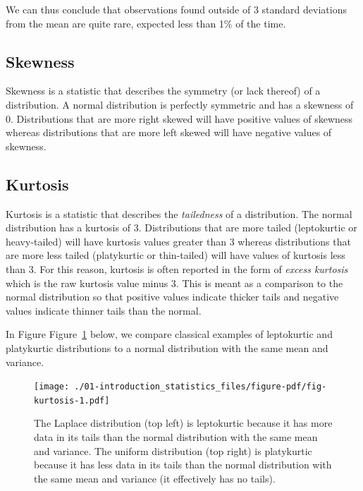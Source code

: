 \documentclass[
  letterpaper,
  DIV=11,
  numbers=noendperiod]{scrreprt}
\begin{document}
We can thus conclude that observations found outside of 3 standard
deviations from the mean are quite rare, expected less than 1\% of the
time.

\hypertarget{skew}{%
\subsection{Skewness}\label{skew}}

Skewness is a statistic that describes the symmetry (or lack thereof) of
a distribution. A normal distribution is perfectly symmetric and has a
skewness of 0. Distributions that are more right skewed will have
positive values of skewness whereas distributions that are more left
skewed will have negative values of skewness.

\hypertarget{kurt}{%
\subsection{Kurtosis}\label{kurt}}

Kurtosis is a statistic that describes the \emph{tailedness} of a
distribution. The normal distribution has a kurtosis of 3. Distributions
that are more tailed (leptokurtic or heavy-tailed) will have kurtosis
values greater than 3 whereas distributions that are more less tailed
(platykurtic or thin-tailed) will have values of kurtosis less than 3.
For this reason, kurtosis is often reported in the form of \emph{excess
kurtosis} which is the raw kurtosis value minus 3. This is meant as a
comparison to the normal distribution so that positive values indicate
thicker tails and negative values indicate thinner tails than the
normal.

In Figure Figure~\ref{fig-kurtosis} below, we compare classical examples
of leptokurtic and platykurtic distributions to a normal distribution
with the same mean and variance.

\begin{figure}

{\centering \texttt{[image: ./01-introduction\_statistics\_files/figure-pdf/fig-kurtosis-1.pdf]}

}

\caption{\label{fig-kurtosis}The Laplace distribution (top left) is
leptokurtic because it has more data in its tails than the normal
distribution with the same mean and variance. The uniform distribution
(top right) is platykurtic because it has less data in its tails than
the normal distribution with the same mean and variance (it effectively
has no tails).}

\end{figure}
\end{document}
